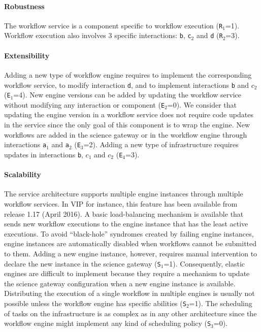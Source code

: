 \documentclass[preprint,3p,twocolumn]{elsarticle}
\begin{document}
\paragraph{Robustness} The workflow service is a component specific to
workflow execution (\texttt{R$_1$}=1). Workflow execution also
involves 3 specific interactions: \texttt{b},
\texttt{c$_2$} and \texttt{d} (\texttt{R$_2$}=3).

\paragraph{Extensibility} Adding a new type of workflow engine
requires to implement the corresponding workflow service, to modify
interaction \texttt{d}, and to implement interactions \texttt{b} and
\texttt{$c_2$} (\texttt{E$_1$}=4). New engine versions can be added by
updating the workflow service without modifying any interaction or
component (\texttt{E$_2$}=0). We consider that updating the engine
version in a workflow service does not require code updates in the
service since the only goal of this component is to wrap the engine.
New workflows are added in the science gateway or in the workflow
engine through interactions \texttt{a$_1$} and \texttt{a$_2$}
(\texttt{E$_3$}=2). Adding a new type of infrastructure requires
updates in interactions \texttt{b}, \texttt{$c_1$} and \texttt{$c_2$}
(\texttt{E$_4$}=3).

\paragraph{Scalability} The service architecture supports multiple
engine instances through multiple workflow services. In VIP for
instance, this feature has been available from release 1.17 (April
2016). A basic load-balancing mechanism is available that sends new
workflow executions to the engine instance that has the least active
executions. To avoid ``black-hole'' syndromes created by failing
engine instances, engine instances are automatically disabled when
workflows cannot be submitted to them. Adding a new engine instance,
however, requires manual intervention to declare the new instance in
the science gateway (\texttt{S$_1$}=1). Consequently, elastic engines
are difficult to implement because they require a mechanism to update
the science gateway configuration when a new engine instance is
available. Distributing the execution of a single
workflow in multiple engines is usually not possible unless the
workflow engine has specific abilities (\texttt{S$_2$}=1). The
scheduling of tasks on the infrastructure is as complex as in any
other architecture since the workflow engine might implement any kind
of scheduling policy (\texttt{S$_3$}=0).
\end{document}
